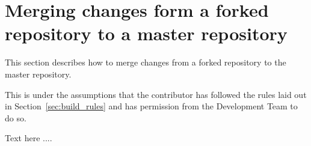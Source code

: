 \section{Merging changes form a forked repository to a master repository\label{sec:pull_requests}}

This section describes how to merge changes from a forked repository to the master repository. 

This is under the assumptions that the contributor has followed the rules laid out in Section~\ref{sec:build_rules} and has permission from the Development Team to do so.

Text here ....